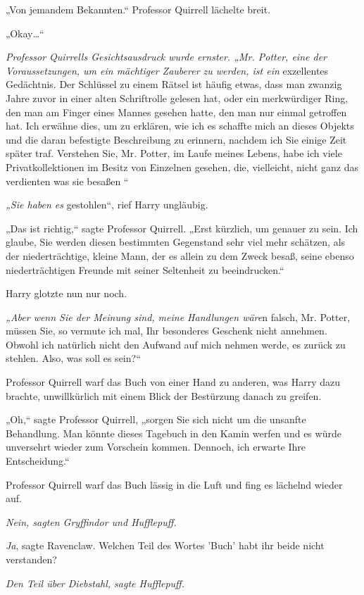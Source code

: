 {„Von jemandem Bekannten.“ Professor Quirrell lächelte breit.

„Okay…“

\emph{Professor Quirrells Gesichtsausdruck wurde ernster. „Mr. Potter, eine der Voraussetzungen, um ein mächtiger Zauberer zu werden, ist ein} exzellentes Gedächtnis. Der Schlüssel zu einem Rätsel ist häufig etwas, dass man zwanzig Jahre zuvor in einer alten Schriftrolle gelesen hat, oder ein merkwürdiger Ring, den man am Finger eines Mannes gesehen hatte, den man nur einmal getroffen hat. Ich erwähne dies, um zu erklären, wie ich es schaffte mich an dieses Objekts und die daran befestigte Beschreibung zu erinnern, nachdem ich Sie einige Zeit später traf. Verstehen Sie, Mr. Potter, im Laufe meines Lebens, habe ich viele Privatkollektionen im Besitz von Einzelnen gesehen, die, vielleicht, nicht ganz das verdienten was sie besaßen \later“

\emph{„Sie haben es} gestohlen“, rief Harry ungläubig.

„Das ist richtig,“ sagte Professor Quirrell. „Erst kürzlich, um genauer zu sein. Ich glaube, Sie werden diesen bestimmten Gegenstand sehr viel mehr schätzen, als der niederträchtige, kleine Mann, der es allein zu dem Zweck besaß, seine ebenso niederträchtigen Freunde mit seiner Seltenheit zu beeindrucken.“

Harry glotzte nun nur noch.

\emph{„Aber wenn Sie der Meinung sind, meine Handlungen wäre}n falsch, Mr. Potter, müssen Sie, so vermute ich mal, Ihr besonderes Geschenk nicht annehmen. Obwohl ich natürlich nicht den Aufwand auf mich nehmen werde, es zurück zu stehlen. Also, was soll es sein?“

Professor Quirrell warf das Buch von einer Hand zu anderen, was Harry dazu brachte, unwillkürlich mit einem Blick der Bestürzung danach zu greifen.

„Oh,“ sagte Professor Quirrell, „sorgen Sie sich nicht um die unsanfte Behandlung. Man könnte dieses Tagebuch in den Kamin werfen und es würde unversehrt wieder zum Vorschein kommen. Dennoch, ich erwarte Ihre Entscheidung.“

Professor Quirrell warf das Buch lässig in die Luft und fing es lächelnd wieder auf.

\emph{Nein, sagten Gryffindor und Hufflepuff.}

\emph{Ja}, sagte Ravenclaw. Welchen Teil des Wortes 'Buch' habt ihr beide nicht verstanden?

\emph{Den Teil über Diebstahl, sagte Hufflepuff.}

}
